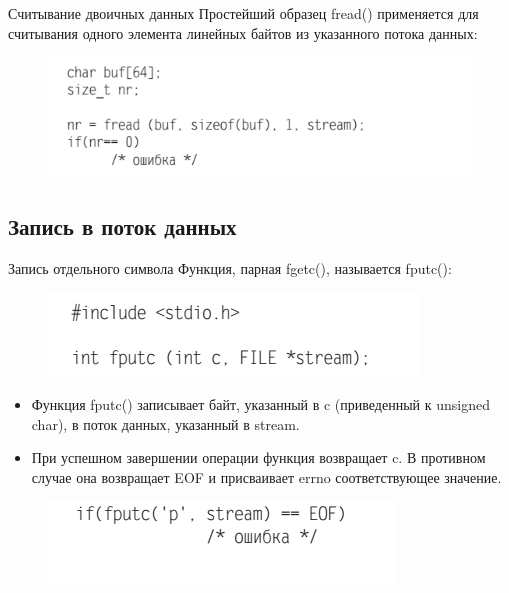 \documentclass{beamer}
\begin{document}
\begin{frame}{Считывание двоичных данных}
Простейший образец fread() применяется для считывания одного элемента линейных байтов из указанного потока данных:
\begin{figure}[h]
\centering
\includegraphics[scale=0.75]{images/lec05-pic16.png}
\end{figure}
\end{frame}

\subsection{Запись в поток данных}

\begin{frame}{Запись отдельного символа}
Функция, парная fgetc(), называется fputc():
\begin{figure}[h]
\centering
\includegraphics[scale=0.75]{images/lec05-pic17.png}
\end{figure}
\begin{itemize}
\item Функция fputc() записывает байт, указанный в c (приведенный к unsigned char),
в поток данных, указанный в stream. 
\item При успешном завершении операции функция возвращает c. В противном случае она возвращает EOF и присваивает errno соответствующее значение.
\end{itemize}
\begin{figure}[h]
\centering
\includegraphics[scale=0.75]{images/lec05-pic18.png}
\end{figure}
\end{frame}
\end{document}
